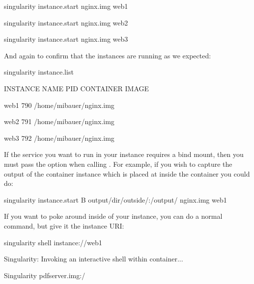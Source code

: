 \documentclass[letterpaper,10pt,english]{sphinxmanual}
\begin{document}
%
\begin{sphinxVerbatim}[commandchars=\\\{\}]
\PYGZdl{} singularity instance.start   nginx.img  web1

\PYGZdl{} singularity instance.start   nginx.img  web2

\PYGZdl{} singularity instance.start   nginx.img  web3
\end{sphinxVerbatim}

And again to confirm that the instances are running as we expected:

%
\begin{sphinxVerbatim}[commandchars=\\\{\}]
\PYGZdl{} singularity instance.list

INSTANCE NAME    PID      CONTAINER IMAGE

web1             790      /home/mibauer/nginx.img

web2             791      /home/mibauer/nginx.img

web3             792      /home/mibauer/nginx.img
\end{sphinxVerbatim}

If the service you want to run in your instance requires a bind mount,
then you must pass the  option when calling . For example, if you wish to
capture the output of the  container instance which is placed at  inside
the container you could do:

%
\begin{sphinxVerbatim}[commandchars=\\\{\}]
\PYGZdl{} singularity instance.start \PYGZhy{}B output/dir/outside/:/output/ nginx.img  web1
\end{sphinxVerbatim}

If you want to poke around inside of your instance, you can do a normal 
command, but give it the instance URI:

%
\begin{sphinxVerbatim}[commandchars=\\\{\}]
\PYGZdl{} singularity shell instance://web1

Singularity: Invoking an interactive shell within container...


Singularity pdf\PYGZus{}server.img:\PYGZti{}/\PYGZgt{}
\end{sphinxVerbatim}
\end{document}
